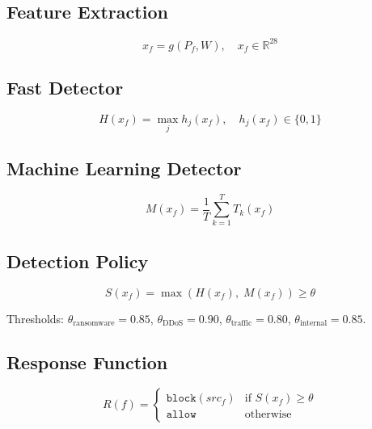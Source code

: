 \documentclass[11pt,a4paper]{article}
\begin{document}
    \subsection{Feature Extraction}

    \begin{equation}
        x_f = g(P_f, W), \quad x_f \in \mathbb{R}^{28}
    \end{equation}

    \subsection{Fast Detector}

    \begin{equation}
        H(x_f) = \max_j h_j(x_f), \quad h_j(x_f) \in \{0, 1\}
    \end{equation}

    \subsection{Machine Learning Detector}

    \begin{equation}
        M(x_f) = \frac{1}{T} \sum_{k=1}^{T} T_k(x_f)
    \end{equation}

    \subsection{Detection Policy}

    \begin{equation}
        S(x_f) = \max\!\left(H(x_f),\; M(x_f)\right) \geq \theta
    \end{equation}

    Thresholds: $\theta_{\text{ransomware}} = 0.85$, $\theta_{\text{DDoS}} = 0.90$,
    $\theta_{\text{traffic}} = 0.80$, $\theta_{\text{internal}} = 0.85$.

    \subsection{Response Function}

    \begin{equation}
        R(f) = \begin{cases}
                   \texttt{block}(src_f) & \text{if } S(x_f) \geq \theta \\
                   \texttt{allow}        & \text{otherwise}
        \end{cases}
    \end{equation}
\end{document}
